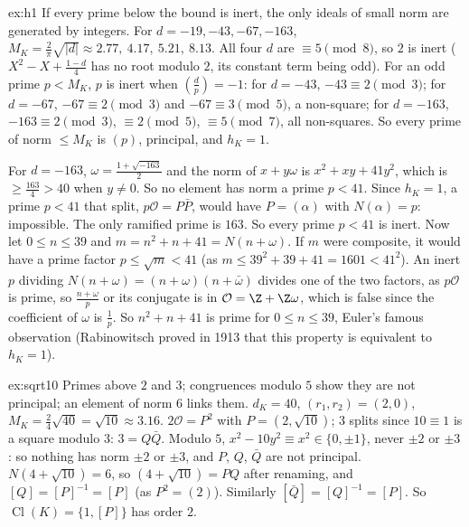 \begin{solution}{ex:h1}
\idea If every prime below the bound is inert, the only ideals of small norm are generated by integers.
\writeup For $d=-19,-43,-67,-163$, $M_K=\frac2\pi\sqrt{|d|}\approx2.77,\ 4.17,\ 5.21,\ 8.13$. All four $d$ are $\equiv5
\pmod8$, so $2$ is inert ($X^2-X+\frac{1-d}4$ has no root modulo $2$, its constant term being odd). For an odd prime
$p<M_K$, $p$ is inert when $\left(\frac dp\right)=-1$: for $d=-43$, $-43\equiv2\pmod 3$; for $d=-67$, $-67\equiv2\pmod3$ and
$-67\equiv3\pmod5$, a non-square; for $d=-163$, $-163\equiv2\pmod3$, $\equiv2\pmod5$, $\equiv5\pmod7$, all non-squares.
So every prime of norm $\le M_K$ is $(p)$, principal, and $h_K=1$.

For $d=-163$, $\omega=\frac{1+\sqrt{-163}}2$ and the norm of $x+y\omega$ is $x^2+xy+41y^2$, which is $\ge\frac{163}4>40$
when $y\ne0$. So no element has norm a prime $p<41$. Since $h_K=1$, a prime $p<41$ that split, $p\mathcal O=P\bar P$,
would have $P=(\alpha)$ with $N(\alpha)=p$: impossible. The only ramified prime is $163$. So every prime $p<41$ is inert.
Now let $0\le n\le39$ and $m=n^2+n+41=N(n+\omega)$. If $m$ were composite, it would have a prime factor $p\le\sqrt m<41$
(as $m\le39^2+39+41=1601<41^2$). An inert $p$ dividing $N(n+\omega)=(n+\omega)(n+\bar\omega)$ divides one of the two
factors, as $p\mathcal O$ is prime, so $\frac{n+\omega}p$ or its conjugate is in $\mathcal O=\Z+\Z\omega$, which is false since
the coefficient of $\omega$ is $\frac1p$. So $n^2+n+41$ is prime for $0\le n\le39$, Euler's famous observation
(Rabinowitsch proved in 1913 that this property is equivalent to $h_K=1$).
\end{solution}

\begin{solution}{ex:sqrt10}
\idea Primes above $2$ and $3$; congruences modulo $5$ show they are not principal; an element of norm $6$ links them.
\writeup $d_K=40$, $(r_1,r_2)=(2,0)$, $M_K=\frac2{4}\sqrt{40}=\sqrt{10}\approx3.16$. $2\mathcal O=P^2$ with $P=(2,\sqrt{10})$;
$3$ splits since $10\equiv1$ is a square modulo $3$: $3=Q\bar Q$. Modulo $5$, $x^2-10y^2\equiv x^2\in\{0,\pm1\}$, never
$\pm2$ or $\pm3$: so nothing has norm $\pm2$ or $\pm3$, and $P$, $Q$, $\bar Q$ are not principal. $N(4+\sqrt{10})=6$, so
$(4+\sqrt{10})=PQ$ after renaming, and $[Q]=[P]^{-1}=[P]$ (as $P^2=(2)$). Similarly $[\bar Q]=[Q]^{-1}=[P]$. So
$\operatorname{Cl}(K)=\{1,[P]\}$ has order $2$.
\end{solution}

